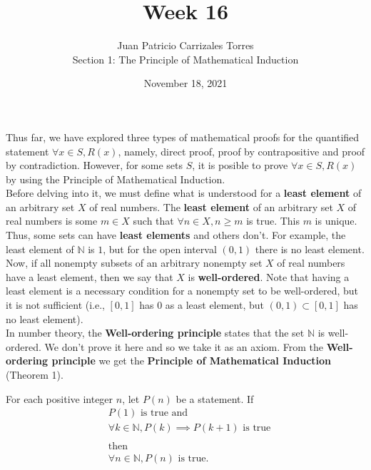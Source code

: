 \documentclass[12pt]{article}
\newcommand{\N}{\mathbb{N}}
\newenvironment{theorem}[2][Theorem]{\begin{trivlist}
		\item[\hskip \labelsep {\bfseries #1}\hskip \labelsep {\bfseries #2.}]}{\end{trivlist}}
\begin{document}
	
	\title{Week 16}
	\author{Juan Patricio Carrizales Torres \\
		Section 1: The Principle of Mathematical Induction}
	\date{November 18, 2021}
	\maketitle

	Thus far, we have explored three types of mathematical proofs for the quantified statement $\forall x\in S, R(x)$, namely, direct proof, proof by contrapositive and proof by contradiction. However, for some sets $S$, it is posible to prove $\forall x\in S, R(x)$ by using the Principle of Mathematical Induction.\\
	
	Before delving into it, we must define what is understood for a \textbf{least element} of an arbitrary set $X$ of real numbers. The \textbf{least element} of an arbitrary set $X$ of real numbers is some $m\in X$ such that $\forall n\in X, n\geq m$ is true. This $m$ is unique. Thus, some sets can have \textbf{least elements} and others don't. For example, the least element of $\N$ is $1$, but for the open interval $(0,1)$ there is no least element. Now, if all nonempty subsets of an arbitrary nonempty set $X$ of real numbers have a least element, then we say that $X$ is \textbf{well-ordered}. Note that having a least element is a necessary condition for a nonempty set to be well-ordered, but it is not sufficient (i.e., $[0,1]$ has 0 as a least element, but $(0,1)\subset [0,1]$ has no least element).\\ 
	
	In number theory, the \textbf{Well-ordering principle} states that the set $\N$ is well-ordered. We don't prove it here and so we take it as an axiom. From the \textbf{Well-ordering principle} we get the \textbf{Principle of Mathematical Induction} (Theorem 1).
	
	\begin{theorem}{1}
		For each positive integer $n$, let $P(n)$ be a statement. If
		\begin{align*}
			&P(1) \text{ is true and}\\
			&\forall k\in \N, P(k)\implies P(k+1) \text{ is true}\\ \\
			&\text{then}\\
			&\forall n\in \N, P(n) \text{ is true.}
		\end{align*}
	\end{theorem}
\end{document}

